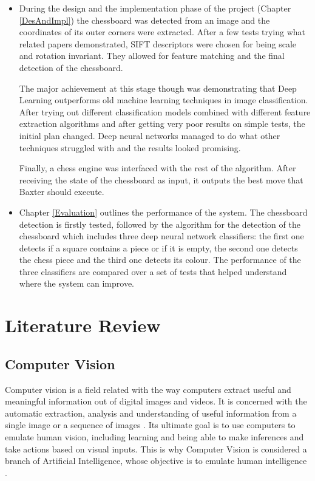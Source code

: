 \documentclass{l4proj}
\begin{document}
\begin{itemize}
	\item During the design and the implementation phase of the project (Chapter \ref{DesAndImpl}) the chessboard was detected from an image and the coordinates of its outer corners were extracted. After a few tests trying what related papers demonstrated, SIFT descriptors were chosen for being scale and rotation invariant. They allowed for feature matching and the final detection of the chessboard. 
	
	The major achievement at this stage though was demonstrating that Deep Learning outperforms old machine learning techniques in image classification. After trying out different classification models combined with different feature extraction algorithms and after getting very poor results on simple tests, the initial plan changed. Deep neural networks managed to do what other techniques struggled with and the results looked promising.
	
	Finally, a chess engine was interfaced with the rest of the algorithm. After receiving the state of the chessboard as input, it outputs the best move that Baxter should execute.
	
	\item  Chapter \ref{Evaluation} outlines the performance of the system. The chessboard detection is firstly tested, followed by the algorithm for the detection of the chessboard which includes three deep neural network classifiers: the first one detects if a square contains a piece or if it is empty, the second one detects the chess piece and the third one detects its colour. The performance of the three classifiers are compared over a set of tests that helped understand where the system can improve.
	
\end{itemize}


\chapter{Literature Review}


\section{Computer Vision}

Computer vision is a field related with the way computers extract useful and meaningful information out of digital images and videos. It is concerned with the automatic extraction, analysis and understanding of useful information from a single image or a sequence of images \cite{CVBMVA}. Its ultimate goal is to use computers to emulate human vision, including learning and being able to make inferences and take actions based on visual inputs. This is why Computer Vision is considered a branch of Artificial Intelligence, whose objective is to emulate human intelligence \cite{DIP}.
\end{document}
